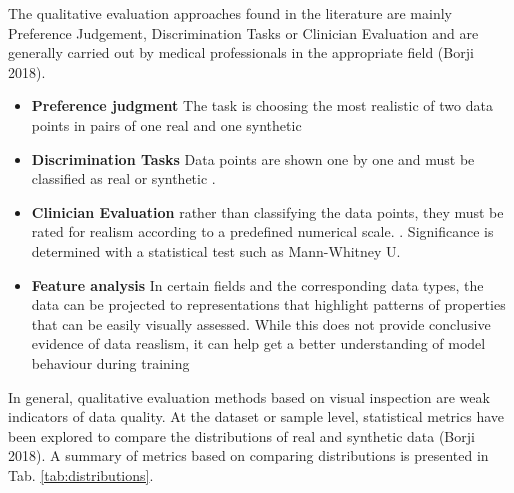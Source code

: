         The qualitative evaluation approaches found in the literature are mainly Preference Judgement, Discrimination Tasks or Clinician Evaluation and are generally carried out by medical professionals in the appropriate field (Borji 2018).
            \begin{itemize}
                \item \textbf{Preference judgment} The task is choosing the most realistic of two data points in pairs of one real and one synthetic \cite{Choi2017-nt}
                \item \textbf{Discrimination Tasks} Data points are shown one by one and must be classified as real or synthetic \cite{Beaulieu-Jones2019-ct}.
                \item \textbf{Clinician Evaluation} rather than classifying the data points, they must be rated for realism according to a predefined numerical scale. \cite{Beaulieu-Jones2019-ct}. Significance is determined with a statistical test such as Mann-Whitney U.
                \item \textbf{Feature analysis} In certain fields and the corresponding data types, the data can be projected to representations that highlight patterns of properties that can be easily visually assessed. While this does not provide conclusive evidence of data reaslism, it can help get a better understanding of model behaviour during training 
            \end{itemize}

        In general, qualitative evaluation methods based on visual inspection are weak indicators of data quality. At the dataset or sample level, statistical metrics have been explored to compare the distributions of real and synthetic data (Borji 2018). A summary of metrics based on comparing distributions is presented in Tab. \ref{tab:distributions}.
        
